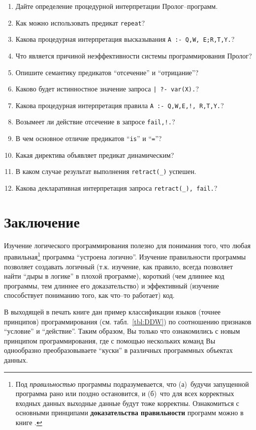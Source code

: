 \documentclass[12pt, openany, twoside]{book} %
\begin{document}
\begin{enumerate}
\item{} Дайте определение процедурной интерпретации Пролог--про\-грамм.
\item{} Как можно использовать предикат \texttt{repeat}?
\item{} Какова процедурная интерпретация высказывания \texttt{A :- Q,W, E;R,T,Y.}?
\item{} Что является причиной неэффективности системы программирования Пролог?
\item{} Опишите семантику предикатов ``отсечение'' и ``отрицание''?
\item{} Каково будет истинностное значение запроса \texttt{| ?- var(X).}?
\item{} Какова процедурная интерпретация правила \texttt{A :- Q,W,E,!, R,T,Y.}?
\item{} Возымеет ли действие отсечение в запросе \texttt{fail,!.}?
\item{} В чем основное отличие предикатов ``\texttt{is}'' и ``\texttt{=}''?
\item{} Какая директива объявляет предикат динамическим?
\item{} В каком случае результат выполнения \texttt{retract(\_)} успешен.
\item{} Какова декларативная интерпретация запроса \texttt{retract(\_), fail.}?
\end{enumerate}

\chapter*{Заключение}


Изучение логического программирования полезно для понимания того, что любая правильная\footnote{Под {\em правильностью} программы подразумевается, что (а)~будучи запущенной программа рано или поздно остановится, и (б)~что для всех корректных входных данных выходные данные будут тоже корректны. Ознакомиться с основными принципами {\bf доказательства правильности} программ можно в книге \cite{Anderson}.} программа ``устроена логично''. Изучение правильности программы позволяет создавать логичный (т.к. изучение, как правило, всегда позволяет найти ``дыры в логике'' в плохой программе), короткий (чем длиннее код программы, тем длиннее его доказательство) и эффективный (изучение способствует пониманию того, как что--то работает) код.

В выходящей в печать книге \cite{DDWII} дан пример классификации языков (точнее принципов) программирования (см. табл.~\ref{tbl:DDW}) по соотношению признаков ``условие'' и ``действие''. Таким образом, Вы только что ознакомились с новым принципом программирования, где с помощью нескольких команд Вы однообразно преобразовываете ``куски'' в различных программных объектах данных.
\end{document}
